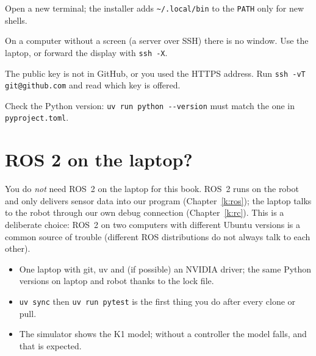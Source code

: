 \begin{troublebox}
\begin{description}[leftmargin=0.6cm,nosep]
  \item[\texttt{uv: command not found}] Open a new terminal; the installer adds \verb!~/.local/bin! to the \texttt{PATH} only for new shells.
  \item[The viewer does not open] On a computer without a screen (a server over SSH) there is no window. Use the laptop, or forward the display with \verb!ssh -X!.
  \item[\texttt{Permission denied (publickey)}] The public key is not in GitHub, or you used the HTTPS address. Run \verb!ssh -vT git@github.com! and read which key is offered.
  \item[Tests fail right after cloning] Check the Python version: \verb!uv run python --version! must match the one in \texttt{pyproject.toml}.
\end{description}
\end{troublebox}

\section*{ROS 2 on the laptop?}
You do \emph{not} need ROS~2 on the laptop for this book. ROS~2 runs on the robot and only delivers sensor data into our program (Chapter~\ref{k:ros}); the laptop talks to the robot through our own debug connection (Chapter~\ref{k:rc}). This is a deliberate choice: ROS~2 on two computers with different Ubuntu versions is a common source of trouble (different ROS distributions do not always talk to each other).

\begin{keyidea}
\begin{itemize}[nosep]
  \item One laptop with git, uv and (if possible) an NVIDIA driver; the same Python versions on laptop and robot thanks to the lock file.
  \item \verb!uv sync! then \verb!uv run pytest! is the first thing you do after every clone or pull.
  \item The simulator shows the K1 model; without a controller the model falls, and that is expected.
\end{itemize}
\end{keyidea}
